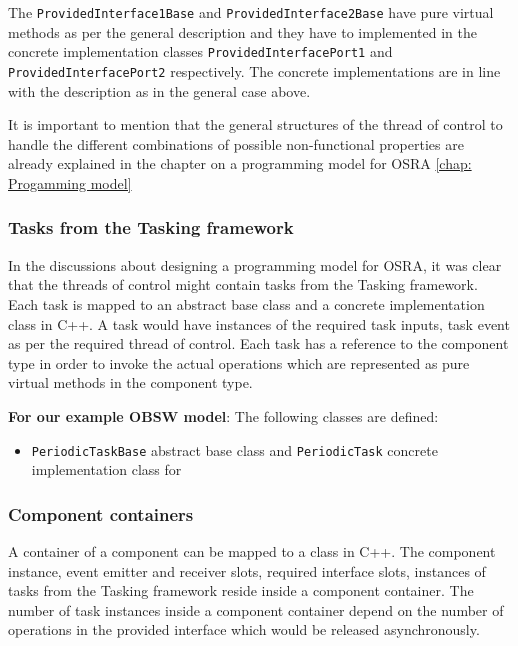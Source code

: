 The \texttt{Provided\allowbreak Interface1\allowbreak Base} and \texttt{Provided\allowbreak Interface2\allowbreak Base} have pure virtual methods as per the general description and they have to implemented in the concrete implementation classes \texttt{Provided\allowbreak Interface\allowbreak Port1} and \texttt{Provided\allowbreak Interface\allowbreak Port2} respectively. The concrete implementations are in line with the description as in the general case above.

It is important to mention that the general structures of the thread of control to handle the different combinations of possible non-functional properties are already explained in the chapter on a programming model for OSRA \cref{chap: Progamming model}

\subsubsection{\textbf{Tasks from the Tasking framework}}
In the discussions about designing a programming model for OSRA, it was clear that the threads of control might contain tasks from the Tasking framework. Each task is mapped to an abstract base class and a concrete implementation class in C++. A task would have instances of the required task inputs, task event as per the required thread of control. Each task has a reference to the component type in order to invoke the actual operations which are represented as pure virtual methods in the component type.

\textbf{For our example OBSW model}: The following classes are defined:
\begin{itemize}
\item \texttt{Periodic\allowbreak TaskBase} abstract base class and \texttt{PeriodicTask} concrete implementation class for 
\end{itemize} 

\subsubsection{\textbf{Component containers}}
A container of a component can be mapped to a class in C++. The component instance, event emitter and receiver slots, required interface slots, instances of tasks from the Tasking framework reside inside a component container. The number of task instances inside a component container depend on the number of operations in the provided interface which would be released asynchronously. 

 
   



 


 
